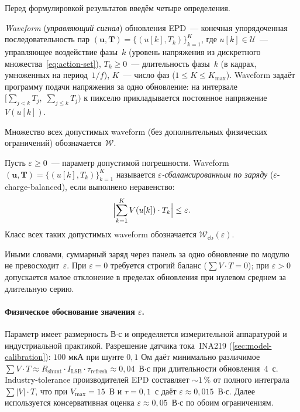 Перед формулировкой результатов введём четыре определения.

\begin{definition}[Waveform]\label{def:waveform}
\emph{Waveform} (\emph{управляющий сигнал}) обновления EPD~---
конечная упорядоченная последовательность пар
$(\mathbf{u}, \mathbf{T}) = \{(u[k], T_k)\}_{k=1}^{K}$, где $u[k] \in \mathcal{U}$~---
управляющее воздействие фазы~$k$ (уровень напряжения из дискретного
множества~\eqref{eq:action-set}), $T_k \ge 0$~--- длительность фазы~$k$
(в кадрах, умноженных на период~$1/f$), $K$~--- число фаз
($1 \le K \le K_{\max}$). Waveform задаёт программу подачи напряжения за одно
обновление: на интервале $[\sum_{j<k} T_j,\; \sum_{j \le k} T_j)$ к пикселю
прикладывается постоянное напряжение $V(u[k])$.

Множество всех допустимых waveform (без дополнительных физических
ограничений) обозначается~$\mathcal{W}$.
\end{definition}

\begin{definition}
\label{def:eps-charge-balanced}
Пусть $\varepsilon \ge 0$~--- параметр допустимой погрешности. Waveform
$(\mathbf{u}, \mathbf{T}) = \{(u[k], T_k)\}_{k=1}^{K}$ называется
\emph{$\varepsilon$-сбалансированным по заряду}
($\varepsilon$-charge-balanced), если выполнено неравенство:
\begin{equation}\label{eq:eps-balance}
    \Bigl|\sum_{k=1}^{K} V(u[k]) \cdot T_k\Bigr| \le \varepsilon.
\end{equation}
Класс всех таких допустимых waveform обозначается
$\mathcal{W}_{\mathrm{cb}}(\varepsilon)$.
\end{definition}

Иными словами, суммарный заряд через панель за одно обновление по модулю не
превосходит~$\varepsilon$. При $\varepsilon = 0$ требуется строгий баланс
($\sum V \cdot T = 0$); при $\varepsilon > 0$ допускается малое отклонение
в пределах обновления при нулевом среднем за длительную серию.

\paragraph{Физическое обоснование значения $\varepsilon$.} Параметр имеет
размерность В$\cdot$с и определяется измерительной аппаратурой и
индустриальной практикой. Разрешение датчика тока~INA219
(\ref{sec:model-calibration}): $100$ мкА при шунте $0{,}1$ Ом даёт минимально
различимое $\sum V \cdot T \approx R_{\mathrm{shunt}} \cdot I_{\mathrm{LSB}}
\cdot \tau_{\mathrm{refresh}} \approx 0{,}04$~В$\cdot$с при длительности
обновления~$4$~с. Industry-tolerance производителей EPD составляет
$\sim 1\,\%$ от полного интеграла $\sum |V| \cdot T$, что при $V_{\max} = 15$~В
и $\tau = 0{,}1$~с даёт $\varepsilon \approx 0{,}015$~В$\cdot$с. Далее
используется консервативная оценка $\varepsilon \approx 0{,}05$~В$\cdot$с по
обоим ограничениям.

